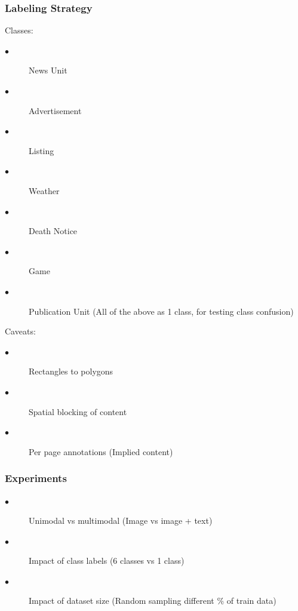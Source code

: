 \documentclass[aspectratio=1610]{beamer}
\begin{document}
\begin{frame}
  \frametitle{Labeling Strategy}

Classes:
\begin{description}
\item[$\bullet$] News Unit
\item[$\bullet$] Advertisement
\item[$\bullet$] Listing
\item[$\bullet$] Weather
\item[$\bullet$] Death Notice
\item[$\bullet$] Game
\item[$\bullet$] Publication Unit (All of the above as 1 class, for testing class confusion)
\end{description}

Caveats:
\begin{description}
\item[$\bullet$] Rectangles to polygons
\item[$\bullet$] Spatial blocking of content
\item[$\bullet$] Per page annotations (Implied content)
\end{description}
\end{frame}
\normalpage


\begin{frame}
  \frametitle{Experiments}

\begin{description}
\item[$\bullet$] Unimodal vs multimodal (Image vs image + text)
\item[$\bullet$] Impact of class labels (6 classes vs 1 class)
\item[$\bullet$] Impact of dataset size (Random sampling different \% of train data)
\end{description}

\end{frame}
\normalpage
\end{document}

